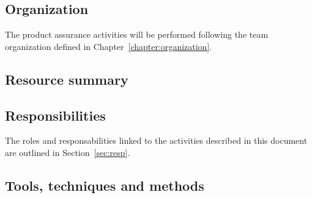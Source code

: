 
\subsection{Organization}

The product assurance activities will be performed following the team organization defined in Chapter~\ref{chapter:organization}.


\subsection{Resource summary}


\subsection{Responsibilities}

The roles and responsabilities linked to the activities described in this document are outlined in Section~\ref{sec:resp}.

%

\subsection{Tools, techniques and methods}

